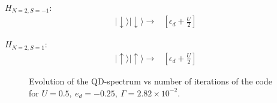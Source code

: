 \begin{multicols}{2}

$H_{N=2,S=-1}:$
\[
\begin{array}{c}
\vert\downarrow\rangle\vert\downarrow\rangle\rightarrow\end{array}\begin{array}{c}
\left[\epsilon_{d}+\frac{U}{2}\right]\end{array}
\]


$H_{N=2,S=1}:$
\[
\begin{array}{c}
\vert\uparrow\rangle\vert\uparrow\rangle\rightarrow\end{array}\begin{array}{c}
\left[\epsilon_{d}+\frac{U}{2}\right]\end{array}
\]


\end{multicols}
\begin{figure}[t]
\caption{\label{Fig-Dot-Spectrum} Evolution of the QD-spectrum vs number of
iterations of the code for $U=0.5,\ e_{d}=-0.25,\ \Gamma=2.82\times10^{-2}.$ }
\end{figure}

